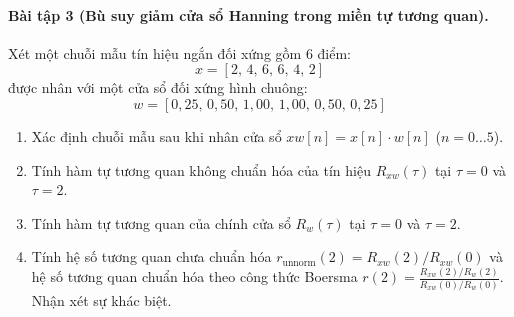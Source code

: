 \paragraph{Bài tập 3 (Bù suy giảm cửa sổ Hanning trong miền tự tương quan).}
Xét một chuỗi mẫu tín hiệu ngắn đối xứng gồm 6 điểm:
\begin{equation}
    x = [2,\, 4,\, 6,\, 6,\, 4,\, 2]
\end{equation}
được nhân với một cửa sổ đối xứng hình chuông:
\begin{equation}
    w = [0{,}25,\, 0{,}50,\, 1{,}00,\, 1{,}00,\, 0{,}50,\, 0{,}25]
\end{equation}
\begin{enumerate}[label=\alph*)]
    \item Xác định chuỗi mẫu sau khi nhân cửa sổ $xw[n] = x[n] \cdot w[n]$ ($n = 0 \dots 5$).
    \item Tính hàm tự tương quan không chuẩn hóa của tín hiệu $R_{xw}(\tau)$ tại $\tau = 0$ và $\tau = 2$.
    \item Tính hàm tự tương quan của chính cửa sổ $R_w(\tau)$ tại $\tau = 0$ và $\tau = 2$.
    \item Tính hệ số tương quan chưa chuẩn hóa $r_{\text{unnorm}}(2) = R_{xw}(2) / R_{xw}(0)$ và hệ số tương quan chuẩn hóa theo công thức Boersma $r(2) = \frac{R_{xw}(2)/R_w(2)}{R_{xw}(0)/R_w(0)}$. Nhận xét sự khác biệt.
\end{enumerate}

